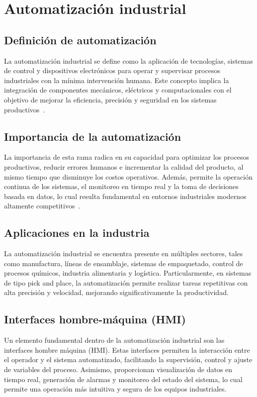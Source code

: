\section{Automatización industrial}

\subsection{Definición de automatización}
La automatización industrial se define como la aplicación de tecnologías, sistemas de control y dispositivos electrónicos para operar y supervisar procesos industriales con la mínima intervención humana. Este concepto implica la integración de componentes mecánicos, eléctricos y computacionales con el objetivo de mejorar la eficiencia, precisión y seguridad en los sistemas productivos~\cite{groover2020automation}.

\subsection{Importancia de la automatización}
La importancia de esta rama radica en su capacidad para optimizar los procesos productivos, reducir errores humanos e incrementar la calidad del producto, al mismo tiempo que disminuye los costos operativos. Además, permite la operación continua de los sistemas, el monitoreo en tiempo real y la toma de decisiones basada en datos, lo cual resulta fundamental en entornos industriales modernos altamente competitivos~\cite{groover2020automation}.

\subsection{Aplicaciones en la industria }
La automatización industrial se encuentra presente en múltiples sectores, tales como manufactura, líneas de ensamblaje, sistemas de empaquetado, control de procesos químicos, industria alimentaria y logística. Particularmente, en sistemas de tipo pick and place, la automatización permite realizar tareas repetitivas con alta precisión y velocidad, mejorando significativamente la productividad.

\subsection{Interfaces hombre-máquina (HMI)}
Un elemento fundamental dentro de la automatización industrial son las interfaces hombre máquina (HMI). Estas interfaces permiten la interacción entre el operador y el sistema automatizado, facilitando la supervisión, control y ajuste de variables del proceso. Asimismo, proporcionan visualización de datos en tiempo real, generación de alarmas y monitoreo del estado del sistema, lo cual permite una operación más intuitiva y segura de los equipos industriales.

